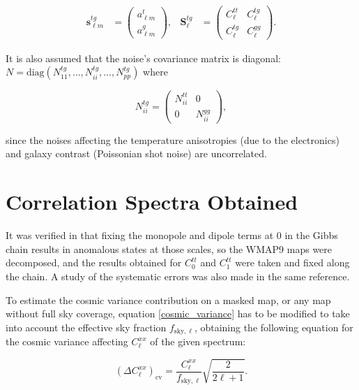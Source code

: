 \documentclass[openany,a4paper,12pt,oneside]{book}
\begin{document}
\begin{spacing}{1.5}
\begin{align}\label{s_lm=}
	\mathbf{s}_{\ell m}^{tg}&=
	\begin{pmatrix}
	a_{\ell m}^t\\
	a_{\ell m}^g
	\end{pmatrix}, &
	\mathbf{S}_\ell^{tg}&=
	\begin{pmatrix}
	C_\ell^{tt} & C_\ell^{tg}\\
	C_\ell^{tg} & C_\ell^{gg}
	\end{pmatrix}.
\end{align}

It is also assumed that the noise's covariance matrix is diagonal: $N=\text{diag}(N_{11}^{tg}, \dots, N_{ii}^{tg}, \dots, N_{pp}^{tg})$ where

\begin{equation}\label{Niitg}
	N_{ii}^{tg}=
	\begin{pmatrix}
	N_{ii}^{tt} & 0 \\
	0 & N_{ii}^{gg}
	\end{pmatrix},
\end{equation}

\noindent since the noises affecting the temperature anisotropies (due to the electronics) and galaxy contrast (Poissonian shot noise) are uncorrelated. 



\section{Correlation Spectra Obtained}

It was verified in \cite{Moura-Santos_2016} that fixing the monopole and dipole terms at 0 in the Gibbs chain results in anomalous states at those scales, so the WMAP9 maps were decomposed, and the results obtained for $C_0^{tt}$ and $C_1^{tt}$ were taken and fixed along the chain. A study of the systematic errors was also made in the same reference. 

To estimate the cosmic variance contribution on a masked map, or any map without full sky coverage, equation \eqref{cosmic_variance} has to be modified to take into account the effective sky fraction $f_{\text{sky},\ell}$, obtaining the following equation for the cosmic variance affecting $C_\ell^{xx}$ of the given spectrum\cite{wmap_supplement}: 

\begin{equation}\label{data_cosmic_variance}
	(\Delta C_\ell^{xx})_\text{cv}=\frac{C_\ell^{xx}}{f_{\text{sky},\ell}}\sqrt{\frac{2}{2\ell+1}}.
\end{equation}


\end{spacing}
\end{document}
